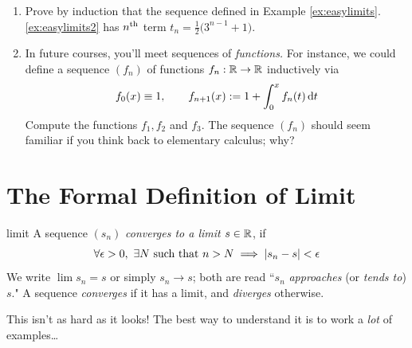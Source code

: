 \begin{exercisessec}{}{}
\begin{enumerate}
	  \item Prove by induction that the sequence defined in Example \ref*{ex:easylimits}.\ref{ex:easylimits2} has $n\textsuperscript{th}$ term $t_n=\frac 12\bigl(3^{n-1}+1\bigr)$.
	  
	  \item In future courses, you'll meet sequences of \emph{functions.} For instance,  we could define a sequence $(f_n)$ of functions $f_n:\mathbb{R}\to\mathbb{R}$ inductively via
	  \[f_0(x)\equiv 1,\qquad f_{n+1}(x):=1+\int_0^x f_n(t)\,{\mathrm{d} t}\]
	  Compute the functions $f_1,f_2$ and $f_3$. The sequence $(f_n)$ should seem familiar if you think back to elementary calculus; why?
	\end{enumerate}
\end{exercisessec}

\clearpage



\section{The Formal Definition of Limit}\label{sec:limitdef}


\begin{defn}{}{limit}
A sequence $(s_n)$ \emph{converges to a limit $s\in\mathbb{R}$}, if\footnotemark
\[\forall\epsilon>0,\ \exists N\ \text{such that}\ n>N\implies \nm{s_n-s}<\epsilon\]
We write $\lim s_n=s$ or simply $s_n\to s$; both are read ``$s_n$ \emph{approaches} (or \emph{tends to}) $s$."\smallbreak
A sequence \emph{converges} if it has a limit, and \emph{diverges} otherwise.
\end{defn}


This isn't as hard as it looks! The best way to understand it is to work a \emph{lot} of examples\ldots




